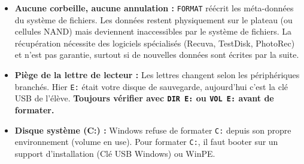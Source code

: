 \documentclass[11pt]{article}
\begin{document}
\begin{attention}
\begin{itemize}
    \item \textbf{Aucune corbeille, aucune annulation :} \texttt{FORMAT} réécrit les méta-données du système de fichiers. Les données restent physiquement sur le plateau (ou cellules NAND) mais deviennent inaccessibles par le système de fichiers. La récupération nécessite des logiciels spécialisés (Recuva, TestDisk, PhotoRec) et n'est pas garantie, surtout si de nouvelles données sont écrites par la suite.
    \item \textbf{Piège de la lettre de lecteur :} Les lettres changent selon les périphériques branchés. Hier \texttt{E:} était votre disque de sauvegarde, aujourd'hui c'est la clé USB de l'élève. \textbf{Toujours vérifier avec \texttt{DIR E:} ou \texttt{VOL E:} avant de formater.}
    \item \textbf{Disque système (C:) :} Windows refuse de formater \texttt{C:} depuis son propre environnement (volume en use). Pour formater \texttt{C:}, il faut booter sur un support d'installation (Clé USB Windows) ou WinPE.
\end{itemize}
\end{attention}
\end{document}
